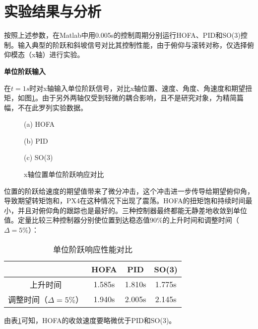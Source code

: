  \section{实验结果与分析}

  按照上述参数，在Matlab中用0.005s的控制周期分别运行HOFA、PID和SO(3)控制。输入典型的阶跃和斜坡信号对比其控制性能，由于俯仰与滚转对称，仅选择俯仰模态（x轴）进行实验。

  \textbf{单位阶跃输入}

  在$t=1s$时对x轴输入单位阶跃信号，对比x轴位置、速度、角度、角速度和期望扭矩，如图\ref{matlab_阶跃}。由于另外两轴仅受到轻微的耦合影响，且不是研究对象，为精简篇幅，不在此罗列实验数据。

  \begin{figure}[h]
    \centering
    \begin{minipage}[t]{0.33\textwidth}
      \centering
      \caption*{(a) HOFA}
    \end{minipage}\hfill
    \begin{minipage}[t]{0.33\textwidth}
      \centering
      \caption*{(b) PID}
    \end{minipage}\hfill
    \begin{minipage}[t]{0.33\textwidth}
      \centering
      \caption*{(c) SO(3)}
    \end{minipage}
    \caption{x轴位置单位阶跃响应对比}
    \label{matlab_阶跃}
\end{figure}

位置的阶跃给速度的期望值带来了微分冲击，这个冲击进一步传导给期望俯仰角，导致期望转矩饱和，PX4在这种情况下出现了震荡。HOFA的扭矩饱和持续时间最小，并且对俯仰角的跟踪也是最好的。三种控制器最终都能无静差地收敛到单位值。定量比较三种控制器分别使位置到达稳态值$90\%$的上升时间和调整时间（$\Delta = 5\%$）：


\begin{table}[h]
  \centering
  \caption{单位阶跃响应性能对比}
  \begin{tabular}{cccc}
      \toprule
      & HOFA & PID & SO(3) \\
      \midrule
    上升时间 & 1.585s & 1.810s & 1.775s\\
    调整时间（$\Delta = 5\%$） & 1.940s & 2.005s &2.145s \\
      \bottomrule
  \end{tabular}

  \label{matlab阶跃对比}
\end{table}
由表\ref{matlab阶跃对比}可知，HOFA的收敛速度要略微优于PID和SO(3)。

